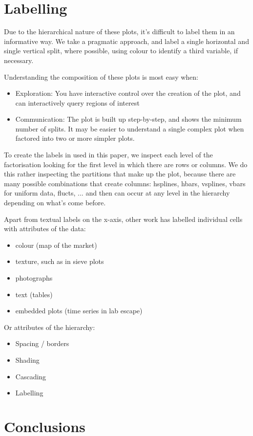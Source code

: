 \documentclass[letterpaper,oneside]{scrartcl}
\begin{document}
\section{Labelling}
\label{sec:legends}

Due to the hierarchical nature of these plots, it's difficult to label them in an informative way. We take a pragmatic approach, and label a single horizontal and single vertical split, where possible, using colour to identify a third variable, if necessary. 

Understanding the composition of these plots is most easy when:

\begin{itemize}

  \item Exploration: You have interactive control over the creation of the plot, and can interactively query regions of interest
  
  \item Communication: The plot is built up step-by-step, and shows the minimum number of splits.  It may be easier to understand a single complex plot when factored into two or more simpler plots.

\end{itemize}

To create the labels in used in this paper, we inspect each level of the factorisation looking for the first level in which there are rows or columns.  We do this rather inspecting the partitions that make up the plot, because there are many possible combinations that create columns: hsplines, hbars, vsplines, vbars for uniform data, flucts, ... and then can occur at any level in the hierarchy depending on what's come before.

Apart from textual labels on the x-axis, other work has labelled individual cells with attributes of the data:

\begin{itemize}
  \item colour (map of the market)
  \item texture, such as in sieve plots \citep{friendly:2000}
  \item photographs \citep{bederson:2001}
  \item text (tables)
  \item embedded plots (time series in lab escape)
\end{itemize}

Or attributes of the hierarchy:

\begin{itemize}
  \item Spacing / borders
  \item Shading
  \item Cascading
  \item Labelling
\end{itemize}

\section{Conclusions} %
\label{sec:conclusions}



\end{document}

